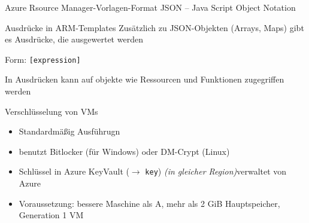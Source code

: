 


\begin{flashcard}[Definition]{Azure Rsource Manager-Vorlagen-Format}
    JSON -- Java Script Object Notation
\end{flashcard}

\begin{flashcard}[Definition]{Ausdrücke in ARM-Templates}
    Zusätzlich zu JSON-Objekten (Arrays, Maps) gibt es Ausdrücke, die ausgewertet werden

    \vspace{1cm}
    Form: \texttt{[expression]}

    \vspace{1cm}
    In Ausdrücken kann auf objekte wie Ressourcen und Funktionen zugegriffen werden
\end{flashcard}



\begin{flashcard}[Definition]{Verschlüsselung von VMs}
    \begin{itemize}
        \item Standardmäßig Ausführugn
        \item benutzt Bitlocker (für Windows) oder DM-Crypt (Linux)
        \item Schlüssel in Azure KeyVault ($\rightarrow$ \texttt{key})\newline
            \emph{(in gleicher Region)}\newline
            [!] verwaltet von Azure
        \item Voraussetzung: bessere Maschine als A, mehr als 2 GiB Hauptspeicher, Generation 1 VM
    \end{itemize}
\end{flashcard}

